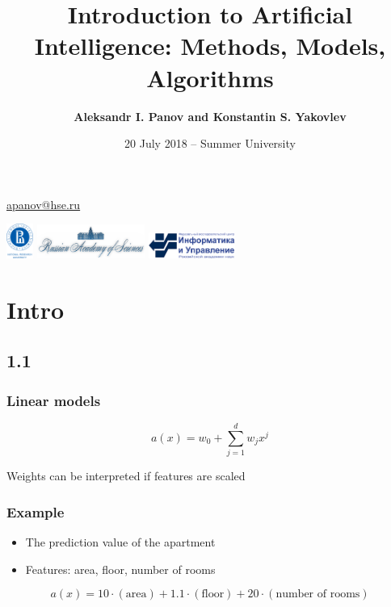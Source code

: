\documentclass[default]{beamer}
\begin{document}
	
	\title[Introduction to AI]{Introduction to Artificial Intelligence: Methods, Models, Algorithms}
	\author[Panov]{\textbf{Aleksandr I. Panov and Konstantin S. Yakovlev}}
	\date{20 July 2018 -- Summer University} 
	
	{
	\begin{frame}
		
		\titlepage
		\centering
		\href{mailto:apanov@hse.ru}{apanov@hse.ru}
		
		\includegraphics[width=25pt]{hse.png} \hspace{10pt}
		\includegraphics[width=100pt]{ras_en.png} \hspace{10pt}
		\includegraphics[width=80pt]{frccsc.png}
		
	\end{frame}
	}	

	\section{Intro}
	\subsection{1.1}
	\begin{frame}
		\frametitle{Linear models}

		\Large
		\[
			a(x)=w_0+\sum_{j=1}^{d} w_jx^j
		\]
		
		Weights can be interpreted if features are scaled
	\end{frame}

	\begin{frame}
		\frametitle{Example}
	
		\Large	
		\begin{itemize}
			\item The prediction value of the apartment
			\item Features: area, floor, number of rooms
		\end{itemize}
	
		\[
		a(x)=10\cdot (\text{area}) + 1.1\cdot (\text{floor}) + 20\cdot (\text{number of rooms})
		\]	
	\end{frame}
\end{document}
